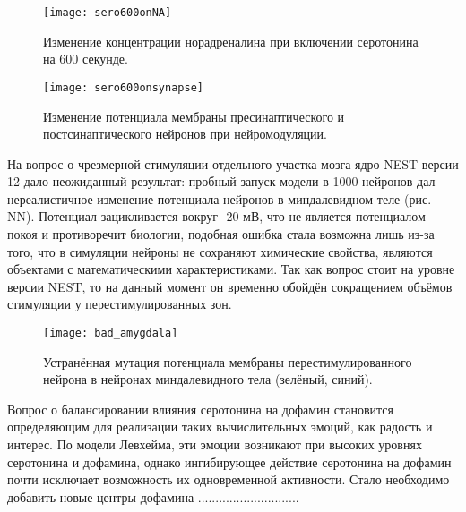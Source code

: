 \begin{figure}
	\centering
	\texttt{[image: sero600onNA]}
	\caption{Изменение концентрации норадреналина при включении серотонина на 600 секунде.}
	\label{fig:sero600onNA}
\end{figure}

\begin{figure}
	\centering
	\texttt{[image: sero600onsynapse]}
	\caption{Изменение потенциала мембраны пресинаптического и постсинаптического нейронов при нейромодуляции.}
	\label{fig:sero600onsynapse}
\end{figure}

На вопрос о чрезмерной стимуляции отдельного участка мозга ядро NEST версии 12 дало неожиданный результат: пробный запуск модели в 1000 нейронов дал нереалистичное изменение потенциала нейронов в миндалевидном теле (рис. NN). Потенциал зацикливается вокруг -20 мВ, что не является потенциалом покоя и противоречит биологии, подобная ошибка стала возможна лишь из-за того, что в симуляции нейроны не сохраняют химические свойства, являются объектами с математическими характеристиками. Так как вопрос стоит на уровне версии NEST, то на данный момент он временно обойдён сокращением объёмов стимуляции у перестимулированных зон.

\begin{figure}
	\centering
	\texttt{[image: bad\_amygdala]}
	\caption{Устранённая мутация потенциала мембраны перестимулированного нейрона в нейронах миндалевидного тела (зелёный, синий).}
	\label{fig:bad_amygdala}
\end{figure}


Вопрос о балансировании влияния серотонина на дофамин становится определяющим для реализации таких вычислительных эмоций, как радость и интерес. По модели Левхейма, эти эмоции возникают при высоких уровнях серотонина и дофамина, однако ингибирующее действие серотонина на дофамин почти исключает возможность их одновременной активности. Стало необходимо добавить новые центры дофамина .............................